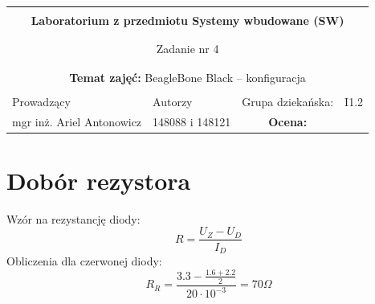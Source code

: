 \documentclass[polish,a4paper]{article}
\begin{document}
	\begin{center}
		\begin{tabular}{ p{} p{} p{} p{} p{} }
			
			&   &   &   &  \\
			\hline
			\multicolumn{5}{|c|}{}\\[-1ex]
			\multicolumn{5}{|c|}{{\LARGE \textbf{Laboratorium z przedmiotu Systemy wbudowane (SW)}}}\\
			\multicolumn{5}{|c|}{}\\[-1ex]
			\hline
			\hline
			
			\multicolumn{5}{|c|}{}\\[-1ex]
			\multicolumn{5}{|c|}{{\LARGE Zadanie nr 4}}\\
			\multicolumn{5}{|c|}{}\\[-1ex]
			\hline
			\hline
			
			\multicolumn{5}{|c|}{}\\[-1ex]
			\multicolumn{5}{|c|}{{\textbf{Temat zajęć:} BeagleBone Black – konfiguracja}}\\
			\multicolumn{5}{|c|}{}\\[-1ex]
			\hline
			\hline
			
			\multicolumn{1}{|l|}{Prowadzący} &
			\multicolumn{2}{|l|}{Autorzy} &
			\multicolumn{1}{|l|}{Grupa dziekańska:}
			&
			\multicolumn{1}{|l|}{I1.2} \\
			\multicolumn{1}{|c|}{mgr inż. Ariel Antonowicz} &
			\multicolumn{2}{|c|}{148088 i 148121} &
			\multicolumn{1}{|c|}{\textbf{Ocena:}} &
			\multicolumn{1}{|c|}{}\\
			\hline
			\hline
		\end{tabular}
	\end{center}
	
	\section{Dobór rezystora}
	Wzór na rezystancję diody:
	$$R = \frac{U_Z - U_D}{I_D}$$
	Obliczenia dla czerwonej diody:
	$$R_R = \frac{3.3 - \frac{1.6 + 2.2}{2}}{20 \cdot 10^{-3}} = 70 \Omega$$
	
\end{document}
